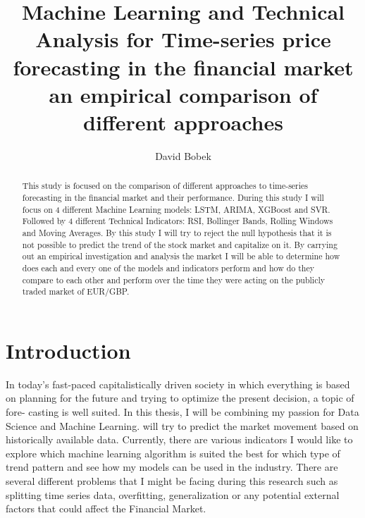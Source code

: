 \documentclass{imc-inf}
\title{Machine Learning and Technical Analysis for Time-series price forecasting in the financial market an empirical comparison of different approaches}
\subtitle{}
\author{David Bobek}
\begin{document}
\frontmatter
\maketitle
\begin{declarations}\end{declarations}

	
	\begin{abstract}
		This study is focused on the comparison of different approaches to time-series forecasting in the financial market and their performance.
		During this study I will focus on 4 different Machine Learning models: LSTM, ARIMA, XGBoost and SVR. Followed by 4 different Technical Indicators: RSI, Bollinger Bands, Rolling Windows and Moving Averages.
		By this study I will try to reject the null hypothesis that it is not possible to predict the trend of the stock market and capitalize on it. By carrying out an empirical
		investigation and analysis the market I will be able to determine how does each and every one of the models and indicators perform and how do they compare to each other and perform 
		over the time they were acting on the publicly traded market of EUR/GBP.
		
		
	\end{abstract}
	
	
	
	\tableofcontents%
	\clearpage
	
	
	\listoftables
	\clearpage
	
	
	\listoffigures
	\clearpage
	
	
	\mainmatter%
	
	\chapter{Introduction}\label{chap:introduction}
	
	In today’s fast-paced capitalistically driven society in which everything is based on
	planning for the future and trying to optimize the present decision, a topic of fore-
	casting is well suited. In this thesis, I will be combining my passion for Data Science
	and Machine Learning. will try to predict the market movement based on historically available data.
	Currently, there are various indicators I would like to explore
	which machine learning algorithm is suited the best for which type of trend pattern
	and see how my models can be used in the industry. There are several different
	problems that I might be facing during this research such as splitting time series data, overfitting,
	generalization or any potential external factors that could affect the Financial Market.
	
\end{document}
